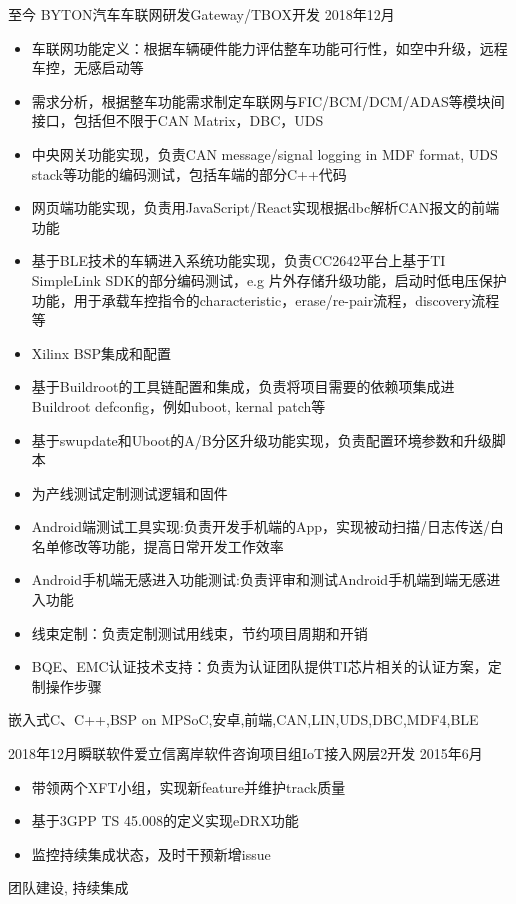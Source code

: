 %
%


 
\begin{experiences}
	
	\experience
	{至今} {BYTON汽车}{车联网研发}{Gateway/TBOX开发}
	{2018年12月 }    {
		\begin{itemize}
			\item 车联网功能定义：根据车辆硬件能力评估整车功能可行性，如空中升级，远程车控，无感启动等
			\item 需求分析，根据整车功能需求制定车联网与FIC/BCM/DCM/ADAS等模块间接口，包括但不限于CAN Matrix，DBC，UDS
			\item 中央网关功能实现，负责CAN message/signal logging in MDF format, UDS stack等功能的编码测试，包括车端的部分C++代码
			\item 网页端功能实现，负责用JavaScript/React实现根据dbc解析CAN报文的前端功能
			\item 基于BLE技术的车辆进入系统功能实现，负责CC2642平台上基于TI SimpleLink SDK的部分编码测试，e.g 片外存储升级功能，启动时低电压保护功能，用于承载车控指令的characteristic，erase/re-pair流程，discovery流程等
			\item Xilinx BSP集成和配置
			\item 基于Buildroot的工具链配置和集成，负责将项目需要的依赖项集成进Buildroot defconfig，例如uboot, kernal patch等
			\item 基于swupdate和Uboot的A/B分区升级功能实现，负责配置环境参数和升级脚本
			\item 为产线测试定制测试逻辑和固件
			\item Android端测试工具实现:负责开发手机端的App，实现被动扫描/日志传送/白名单修改等功能，提高日常开发工作效率
			\item Android手机端无感进入功能测试:负责评审和测试Android手机端到端无感进入功能
			\item 线束定制：负责定制测试用线束，节约项目周期和开销
			\item BQE、EMC认证技术支持：负责为认证团队提供TI芯片相关的认证方案，定制操作步骤
		\end{itemize}
	}
	{嵌入式C、C++,BSP on MPSoC,安卓,前端,CAN,LIN,UDS,DBC,MDF4,BLE}
	
	\emptySeparator	
	\experience
	{2018年12月}{瞬联软件}{爱立信离岸软件咨询项目组}{IoT接入网层2开发}
	{2015年6月} {
		\begin{itemize}
            \item 带领两个XFT小组，实现新feature并维护track质量
			\item 基于3GPP TS 45.008的定义实现eDRX功能
			\item 监控持续集成状态，及时干预新增issue
		\end{itemize}
	}
	{团队建设, 持续集成}
		

\end{experiences}
